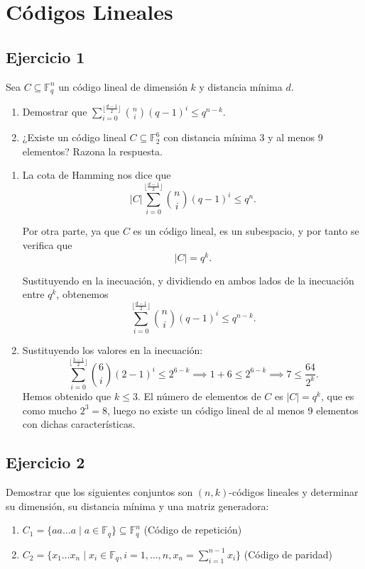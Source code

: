 \chapter{Códigos Lineales}

\section{Ejercicio 1}

\begin{formulationBox}
	Sea $C\subseteq \mathbb{F}_q^n$ un código lineal de dimensión $k$ y distancia mínima $d$.
	
	\begin{enumerate}[label=\alph*)]
		\item Demostrar que $\sum_{i=0}^{\lfloor\frac{d-1}{2}\rfloor} \binom{n}{i} (q-1)^i \leq q^{n-k}$.
		\item ¿Existe un código lineal $C \subseteq \mathbb{F}_2^6$ con distancia mínima 3 y al menos 9 elementos? Razona la respuesta.
	\end{enumerate}
\end{formulationBox}

\begin{enumerate}[label=\alph*)]
	\item La cota de Hamming nos dice que
	\[|C|\sum_{i=0}^{\lfloor\frac{d-1}{2}\rfloor} \binom{n}{i} (q-1)^i \leq q^n.\]
	
	Por otra parte, ya que $C$ es un código lineal, es un subespacio, y por tanto se verifica que
	\[|C| = q^k.\]
	
	Sustituyendo en la inecuación, y dividiendo en ambos lados de la inecuación entre $q^k$, obtenemos
	\[\sum_{i=0}^{\lfloor\frac{d-1}{2}\rfloor} \binom{n}{i} (q-1)^i \leq q^{n-k}.\]
	
	\item Sustituyendo los valores en la inecuación:
	\[\sum_{i=0}^{\lfloor\frac{3-1}{2}\rfloor} \binom{6}{i} (2-1)^i \leq 2^{6-k} \implies 1 + 6 \leq 2^{6-k} \implies 7 \leq \frac{64}{2^k}.\]
	Hemos obtenido que $k \leq 3$. El número de elementos de $C$ es $|C| = q^k$, que es como mucho $2^3 = 8$, luego no existe un código lineal de al menos 9 elementos con dichas características.
\end{enumerate}

\section{Ejercicio 2}

\begin{formulationBox}
	Demostrar que los siguientes conjuntos son $(n, k)$-códigos lineales y determinar su dimensión, su distancia mínima y una matriz generadora:
	
	\begin{enumerate}[label=\alph*)]
		\item $C_1 = \{aa\hdots a\mid a\in\mathbb{F}_q\} \subseteq \mathbb{F}_q^n$ (Código de repetición)
		\item $C_2 = \{x_1\hdots x_n \mid x_i\in\mathbb{F}_q, i=1,\hdots,n,x_n = \sum_{i=1}^{n-1}x_i\}$ (Código de paridad)
	\end{enumerate}
\end{formulationBox}

